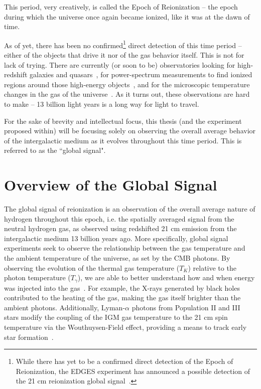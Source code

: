 This period, very creatively, is called the Epoch of Reionization -- the epoch 
during which the universe once again became ionized, like it was at the dawn of 
time.

As of yet, there has been no confirmed\footnote{While there has yet to be a 
confirmed direct detection of the Epoch of Reionization, the EDGES experiment 
has announced a possible detection of the 21 cm reionization global 
signal~\citep{bowman2018}.} direct detection of this time period -- either of 
the objects that drive it nor of the gas behavior itself.  This is not for lack 
of trying.  There are currently (or soon to be) observatories looking for 
high-redshift galaxies and quasars~\citep{gardner2006}, for power-spectrum 
measurements to find ionized regions around those high-energy 
objects~\citep{deboer2017}, and for the microscopic temperature changes in the 
gas of the universe~\citep{bowman2010}.  As it turns out, these observations 
are hard to make -- 13 billion light years is a long way for light to travel.

For the sake of brevity and intellectual focus, this thesis (and the experiment 
proposed within) will be focusing solely on observing the overall average 
behavior of the intergalactic medium as it evolves throughout this time period.  
This is referred to as the ``global signal".

\section{Overview of the Global Signal}

The global signal of reionization is an observation of the overall average 
nature of hydrogen throughout this epoch, i.e. the spatially averaged signal 
from the neutral hydrogen gas, as observed using redshifted 21 cm emission from 
the intergalactic medium 13 billion years ago. More specifically, global signal 
experiments seek to observe the relationship between the gas temperature and 
the ambient temperature of the universe, as set by the CMB photons.  By 
observing the evolution of the thermal gas temperature ($T_K$) relative to the 
photon temperature ($T_\gamma$), we are able to better understand how and when 
energy was injected into the gas~\citep{pritchard-loeb2010}. For example, the 
X-rays generated by black holes contributed to the heating of the gas, making 
the gas itself brighter than the ambient photons. Additionally, Lyman-$\alpha$ 
photons from Population II and III stars modify the coupling of the IGM gas 
temperature to the 21 cm spin temperature via the Wouthuysen-Field effect, 
providing a means to track early star formation~\citep{furlanetto2006}.

